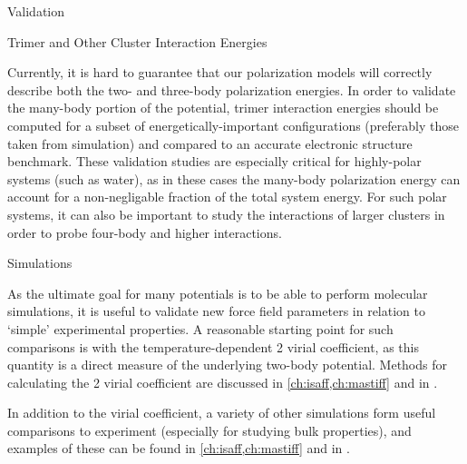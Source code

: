 \begin{subsection}{Validation}

\begin{paragraph}{Trimer and Other Cluster Interaction Energies}

Currently, it is hard to guarantee that our polarization models will
correctly describe both the two- and three-body polarization energies. In
order to validate the many-body portion of the potential, trimer
interaction energies should be computed for a subset of energetically-important configurations
(preferably those taken from simulation) and compared to an accurate
electronic structure benchmark. These validation studies are especially
critical for highly-polar systems (such as water), as in these cases the
many-body polarization energy can account for a non-negligable fraction of the
total system energy. For such polar systems, it can also be important to study
the interactions of larger clusters in order to probe four-body and higher
interactions.\cite{Medders2015a,Cisneros2016,Medders2013}

\end{paragraph}

\begin{paragraph}{Simulations}

As the ultimate goal for many potentials is to be able to perform molecular
simulations, it is useful to validate new force field parameters in relation
to `simple' experimental properties. A reasonable starting point for such
comparisons is with the temperature-dependent 2 virial coefficient, as this quantity is a
direct measure of the underlying two-body potential. Methods for calculating
the 2 virial coefficient are discussed in \cref{ch:isaff,ch:mastiff}
and in .

In addition to the virial coefficient, a variety of other simulations form
useful comparisons to experiment (especially for studying bulk properties),
and examples of these can be found in 
\cref{ch:isaff,ch:mastiff} and in .

\end{paragraph}


\end{subsection}
